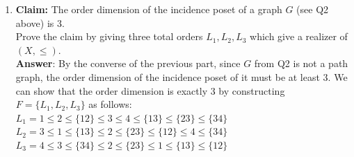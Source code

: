 \documentclass{article}
\begin{document}
\begin{itemize}
\begin{enumerate}
                  \item \textbf{Claim:} The order dimension of the incidence poset of a graph $G$ (see Q2 above) is 3.\\
                        Prove the claim by giving three total orders $L_1,L_2,L_3$ which give a realizer of $(X,\leq)$.\\
                        \textbf{Answer}: By the converse of the previous part, since $G$ from Q2 is not a path graph, the order dimension of the incidence poset of it must be at least 3. We can show that the order dimension is exactly 3 by constructing $F=\{L_1,L_2,L_3\}$ as follows:\\
                        $L_1=1\leq 2\leq\{12\}\leq 3\leq 4\leq\{13\}\leq\{23\}\leq\{34\}$\\
                        $L_2=3\leq 1\leq\{13\}\leq 2\leq\{23\}\leq\{12\}\leq 4\leq\{34\}$\\
                        $L_3=4\leq 3\leq\{34\}\leq 2\leq\{23\}\leq 1\leq\{13\}\leq\{12\}$
            \end{enumerate}
\end{itemize}
\end{document}
